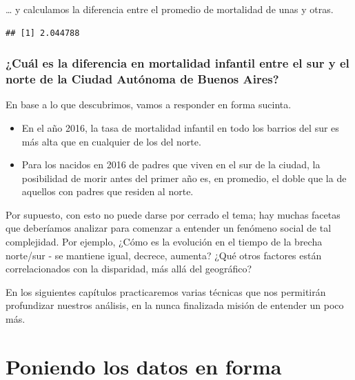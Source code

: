 \documentclass[]{book}
\newenvironment{Shaded}{\begin{snugshade}}{\end{snugshade}}
\newcommand{\KeywordTok}[1]{\textcolor[rgb]{0.13,0.29,0.53}{\textbf{#1}}}
\newcommand{\StringTok}[1]{\textcolor[rgb]{0.31,0.60,0.02}{#1}}
\newcommand{\OperatorTok}[1]{\textcolor[rgb]{0.81,0.36,0.00}{\textbf{#1}}}
\newcommand{\NormalTok}[1]{#1}
\begin{document}
\ldots{} y calculamos la diferencia entre el promedio de mortalidad de
unas y otras.

\begin{Shaded}
\end{Shaded}

\begin{verbatim}
## [1] 2.044788
\end{verbatim}

\subsection{¿Cuál es la diferencia en mortalidad infantil entre el sur y
el norte de la Ciudad Autónoma de Buenos
Aires?}\label{cual-es-la-diferencia-en-mortalidad-infantil-entre-el-sur-y-el-norte-de-la-ciudad-autonoma-de-buenos-aires}

En base a lo que descubrimos, vamos a responder en forma sucinta.

\begin{itemize}
\item
  En el año 2016, la tasa de mortalidad infantil en todo los barrios del
  sur es más alta que en cualquier de los del norte.
\item
  Para los nacidos en 2016 de padres que viven en el sur de la ciudad,
  la posibilidad de morir antes del primer año es, en promedio, el doble
  que la de aquellos con padres que residen al norte.
\end{itemize}

Por supuesto, con esto no puede darse por cerrado el tema; hay muchas
facetas que deberíamos analizar para comenzar a entender un fenómeno
social de tal complejidad. Por ejemplo, ¿Cómo es la evolución en el
tiempo de la brecha norte/sur - se mantiene igual, decrece, aumenta?
¿Qué otros factores están correlacionados con la disparidad, más allá
del geográfico?

En los siguientes capítulos practicaremos varias técnicas que nos
permitirán profundizar nuestros análisis, en la nunca finalizada misión
de entender un poco más.

\chapter{Poniendo los datos en forma}\label{poniendo-los-datos-en-forma}
\end{document}
